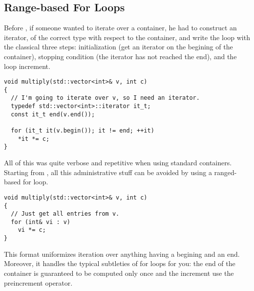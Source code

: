 \subsection{Range-based For Loops}
\label{range-based-for-loops}

\problemtitle

Before , if someone wanted to iterate over a container, he had
to construct an iterator, of the correct type with respect to the
container, and write the loop with the classical three steps:
initialization (get an iterator on the begining of the container),
stopping condition (the iterator has not reached the end), and the
loop increment.

\begin{lstlisting}
void multiply(std::vector<int>& v, int c)
{
  // I'm going to iterate over v, so I need an iterator.
  typedef std::vector<int>::iterator it_t;
  const it_t end(v.end());

  for (it_t it(v.begin()); it != end; ++it)
    *it *= c;
}
\end{lstlisting}

\solutiontitle

All of this was quite verbose and repetitive when using standard
containers. Starting from , all this administrative stuff can be
avoided by using a ranged-based for loop.

\begin{lstlisting}
void multiply(std::vector<int>& v, int c)
{
  // Just get all entries from v.
  for (int& vi : v)
    vi *= c;
}
\end{lstlisting}

This format uniformizes iteration over anything having a begining and
an end. Moreover, it handles the typical subtleties of for loops for
you: the end of the container is guaranteed to be computed only once
and the increment use the preincrement operator.
